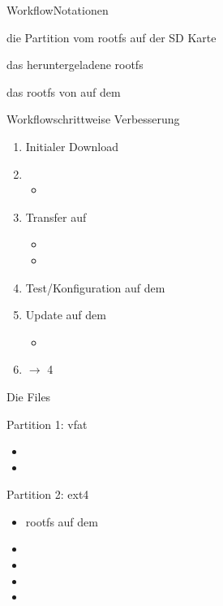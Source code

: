 \begin{frame}{Workflow}{Notationen}
 \begin{description}[\tar]
  \item[\cod{\em sd-card}] die Partition vom rootfs auf der SD Karte
  \item[\tar] das heruntergeladene rootfs
  \item[\cod{\em target-root}] das rootfs von \targetS auf dem \host
 \end{description}
\end{frame}

\begin{frame}{Workflow}{schrittweise Verbesserung}
 \begin{enumerate}
  \item Initialer Download \tar
  \item {}
  \begin{itemize}
   \item {}
  \end{itemize} 
  \item Transfer auf 
  \begin{itemize}
   \item {}
   \item {} 
  \end{itemize} 
  \item Test/Konfiguration auf dem \targetS
  \item Update auf dem \host
  \begin{itemize}
   \item {}
  \end{itemize} 
  \item $\to$ 4
 \end{enumerate}
\end{frame}

\begin{frame}{Die Files}
 \begin{block}{Partition 1: vfat}
  \begin{itemize}
   \item {}
   \item {}
  \end{itemize}
 \end{block}
 \begin{block}{Partition 2: ext4}
  \begin{itemize}
   \item rootfs auf dem \host
   \item {}
   \item {}
   \item {}
   \item {}
  \end{itemize}
 \end{block}
 
\end{frame}

